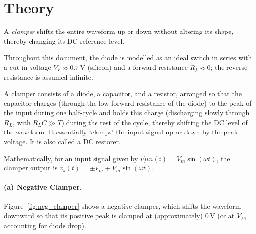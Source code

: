 \section{Theory}

A \emph{clamper} shifts the entire waveform up or down without altering its shape, thereby changing its DC reference level.

Throughout this document, the diode is modelled as an ideal switch in series with a cut-in voltage $V_F \approx 0.7\,\text{V}$ (silicon) and a forward resistance $R_f \approx 0$; the reverse resistance is assumed infinite. 

A clamper consists of a diode, a capacitor, and a resistor, arranged so that the capacitor charges (through the low forward resistance of the diode) to the peak of the input during one half-cycle and holds this charge (discharging slowly through $R_L$, with $R_LC \gg T$) during the rest of the cycle, thereby shifting the DC level of the waveform. It essentially `clamps' the input signal up or down by the peak voltage. It is also called a DC restorer.

Mathematically, for an input signal given by $v){in}(t) = V_m\sin(\omega t)$, the clamper output is $v_o(t)= \pm V_m + V_m\sin(\omega t)$.

\paragraph{(a) Negative Clamper.}
Figure~\ref{fig:neg_clamper} shows a negative clamper, which shifts the waveform downward so that its positive peak is clamped at (approximately) $0\,\text{V}$ (or at $V_F$, accounting for diode drop).


